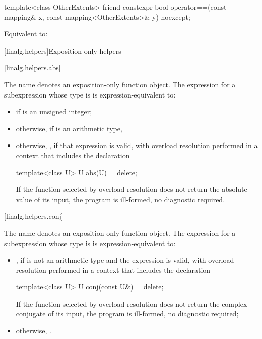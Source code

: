 %
\begin{itemdecl}
template<class OtherExtents>
  friend constexpr bool operator==(const mapping& x, const mapping<OtherExtents>& y) noexcept;
\end{itemdecl}

\begin{itemdescr}
\pnum
\effects
Equivalent to: 
\end{itemdescr}

[linalg.helpers]{Exposition-only helpers}

[linalg.helpers.abs]{}

\pnum
The name  denotes an exposition-only function object.
The expression  for a subexpression 
whose type is  is expression-equivalent to:
\begin{itemize}
\item
{} if  is an unsigned integer;
\item
otherwise,  if  is an arithmetic type,
\item
otherwise, ,
if that expression is valid,
with overload resolution performed in a context that includes the declaration
\begin{codeblock}
template<class U> U abs(U) = delete;
\end{codeblock}
If the function selected by overload resolution
does not return the absolute value of its input,
the program is ill-formed, no diagnostic required.
\end{itemize}

[linalg.helpers.conj]{}

\pnum
The name  denotes an exposition-only function object.
The expression  for a subexpression 
whose type is  is expression-equivalent to:
\begin{itemize}
\item
{},
if  is not an arithmetic type and
the expression  is valid,
with overload resolution performed in a context that includes the declaration
\begin{codeblock}
template<class U> U conj(const U&) = delete;
\end{codeblock}
If the function selected by overload resolution
does not return the complex conjugate of its input,
the program is ill-formed, no diagnostic required;
\item
otherwise, .
\end{itemize}

